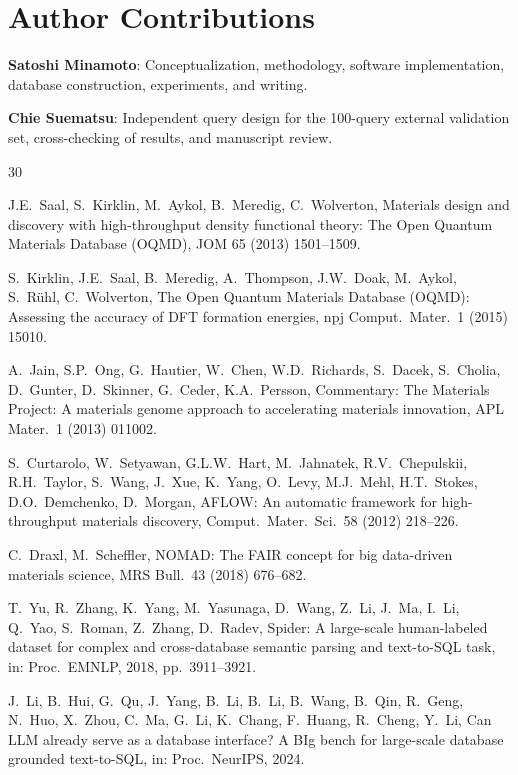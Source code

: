\documentclass{npj-compt.mater}
\begin{document}
\section*{Author Contributions}

\textbf{Satoshi Minamoto}: Conceptualization, methodology, software
implementation, database construction, experiments, and writing.

\textbf{Chie Suematsu}: Independent query design for the 100-query
external validation set, cross-checking of results, and manuscript
review.

\begin{thebibliography}{30}

J.E.~Saal, S.~Kirklin, M.~Aykol, B.~Meredig, C.~Wolverton,
Materials design and discovery with high-throughput density functional theory: {The Open Quantum Materials Database (OQMD)},
JOM 65 (2013) 1501--1509.

S.~Kirklin, J.E.~Saal, B.~Meredig, A.~Thompson, J.W.~Doak, M.~Aykol, S.~R\"uhl, C.~Wolverton,
The {Open Quantum Materials Database (OQMD)}: Assessing the accuracy of {DFT} formation energies,
npj Comput.\ Mater.\ 1 (2015) 15010.

A.~Jain, S.P.~Ong, G.~Hautier, W.~Chen, W.D.~Richards, S.~Dacek, S.~Cholia, D.~Gunter, D.~Skinner, G.~Ceder, K.A.~Persson,
Commentary: {The Materials Project}: A materials genome approach to accelerating materials innovation,
APL Mater.\ 1 (2013) 011002.

S.~Curtarolo, W.~Setyawan, G.L.W.~Hart, M.~Jahnatek, R.V.~Chepulskii, R.H.~Taylor, S.~Wang, J.~Xue, K.~Yang, O.~Levy, M.J.~Mehl, H.T.~Stokes, D.O.~Demchenko, D.~Morgan,
{AFLOW}: An automatic framework for high-throughput materials discovery,
Comput.\ Mater.\ Sci.\ 58 (2012) 218--226.

C.~Draxl, M.~Scheffler,
{NOMAD}: {The FAIR} concept for big data-driven materials science,
MRS Bull.\ 43 (2018) 676--682.

T.~Yu, R.~Zhang, K.~Yang, M.~Yasunaga, D.~Wang, Z.~Li, J.~Ma, I.~Li, Q.~Yao, S.~Roman, Z.~Zhang, D.~Radev,
Spider: A large-scale human-labeled dataset for complex and cross-database semantic parsing and text-to-SQL task,
in: Proc.\ EMNLP, 2018, pp.~3911--3921.

J.~Li, B.~Hui, G.~Qu, J.~Yang, B.~Li, B.~Li, B.~Wang, B.~Qin, R.~Geng, N.~Huo, X.~Zhou, C.~Ma, G.~Li, K.~Chang, F.~Huang, R.~Cheng, Y.~Li,
Can LLM already serve as a database interface? A BIg bench for large-scale database grounded text-to-SQL,
in: Proc.\ NeurIPS, 2024.


\end{thebibliography}
\end{document}
